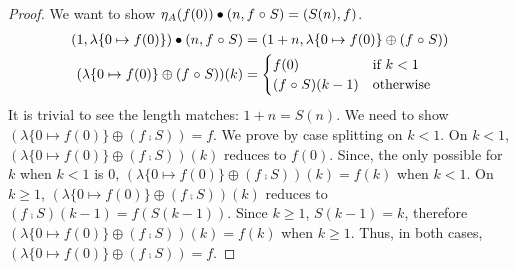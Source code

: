 \begin{proof}
    We want to show $\eta_A (f(0)) \mathbin{\bullet} (n, f \mathrel{\circ} S) = (S(n), f)$.
    \begin{align*}
        (1, \lambda\{ 0 \mapsto f(0) \}) \mathbin{\bullet} (n , f \mathrel{\circ} S) &
        = (1 + n, \lambda\{ 0 \mapsto f(0) \} \oplus (f \mathrel{\circ} S))                                            \\
        (\lambda\{ 0 \mapsto f(0) \} \oplus (f \mathrel{\circ} S))(k)    & = \begin{cases}
                                                                       f(0)               & \text{if}\ k < 1 \\
                                                                       (f \mathrel{\circ} S)(k - 1) & \text{otherwise}
                                                                   \end{cases}
    \end{align*}
    It is trivial to see the length matches: $1 + n = S(n)$. We need to show
    $(\lambda\{ 0 \mapsto f(0) \} \oplus (f \comp S)) = f$.
    We prove by case splitting on $k < 1$.
    On $k < 1$, $(\lambda\{ 0 \mapsto f(0) \} \oplus (f \comp S))(k)$ reduces to $f(0)$.
    Since, the only possible for $k$ when $k < 1$ is 0, $(\lambda\{ 0 \mapsto f(0) \} \oplus (f \comp S))(k) = f(k)$
    when $k < 1$.
    On $k \geq 1$, $(\lambda\{ 0 \mapsto f(0) \} \oplus (f \comp S))(k)$ reduces to $(f \comp S)(k - 1) = f(S(k - 1))$.
    Since $k \geq 1$, $S(k - 1) = k$, therefore $(\lambda\{ 0 \mapsto f(0) \} \oplus (f \comp S))(k) = f(k)$
    when $k \geq 1$.
    Thus, in both cases, $(\lambda\{ 0 \mapsto f(0) \} \oplus (f \comp S)) = f$.
\end{proof}

